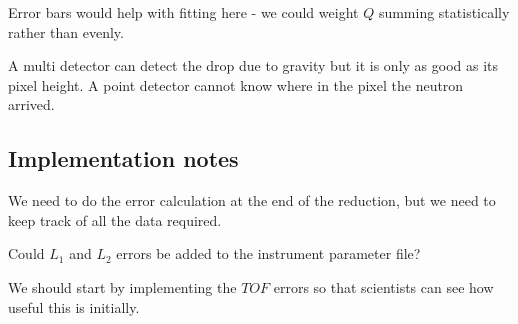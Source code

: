 \documentclass[12pt]{article}
\begin{document}
Error bars would help with fitting here - we could weight $Q$ summing statistically rather than evenly.

A multi detector can detect the drop due to gravity but it is only as good as its pixel height. A point detector cannot know where in the pixel the neutron arrived.

\subsection{Implementation notes}
We need to do the error calculation at the end of the reduction, but we need to keep track of all the data required.

Could $L_1$ and $L_2$ errors be added to the instrument parameter file?

We should start by implementing the $TOF$ errors so that scientists can see how useful this is initially.
\end{document}
